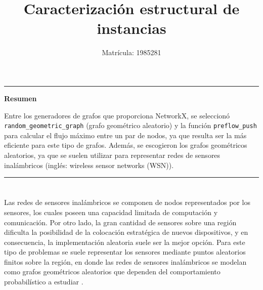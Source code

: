 \documentclass[a4paper, 11pt]{article}
\begin{document}
\title{Caracterización estructural de instancias}
\author{Matr\'icula: 1985281}
\date{ }
\maketitle

\vspace{-1 cm}
\begin{center}\rule{\textwidth}{0.1mm} \end{center}
\vspace{-1.3 cm}
\begin {center}
\item \Large{\textbf{ Resumen}}
\end {center}

Entre los generadores de grafos que proporciona \color{blue} NetworkX\color{black}, se seleccionó \texttt{random\_geometric\_graph} (grafo geométrico aleatorio) y la función \texttt{preflow\_push} para calcular el flujo máximo entre un par de nodos, ya que resulta ser la más eficiente para este tipo de grafos. Además, se escogieron los grafos geométricos aleatorios, ya que se suelen utilizar para representar redes de sensores inalámbricos (inglés: wireless sensor networks (WSN)).
\vspace{-0.5cm}
\begin{center}\rule{\textwidth}{0.1mm} \end{center}




\section*{}
Las redes de sensores inalámbricos se componen de nodos representados por los sensores, los cuales poseen una capacidad limitada de computación y comunicación. Por otro lado, la gran cantidad de sensores sobre una región dificulta la posibilidad de la colocación estratégica de nuevos dispositivos, y en consecuencia, la implementación aleatoria suele ser la mejor opción. Para este tipo de problemas se suele representar los sensores mediante puntos aleatorios finitos sobre la región, en donde las redes de sensores inalámbricos se modelan como grafos geométricos aleatorios que dependen del comportamiento probabilístico a estudiar \cite{graph}.



\section*{}
\end{document}

